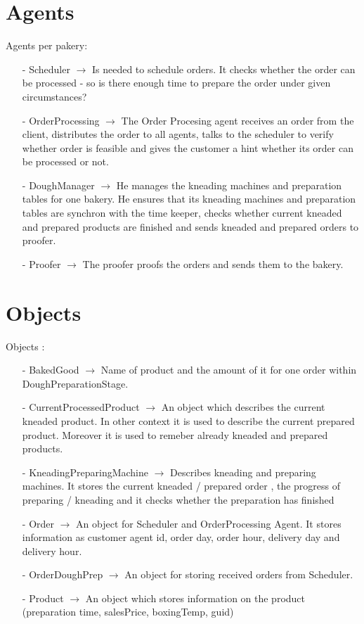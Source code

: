 \documentclass[10pt,a4paper]{article}
\begin{document}
	\section{Agents}
	Agents per pakery:
	\begin{enumerate}
		\item [-] Scheduler $\rightarrow$ Is needed to schedule orders. It checks whether the order can be processed - so is there enough time to prepare the order
		under given circumstances?
		\item [-] OrderProcessing $\rightarrow$ The Order Procesing agent receives an order from the client, distributes the order to all agents, talks to the scheduler
		to verify whether order is feasible and gives the customer a hint whether its order can be processed or not.
		\item [-] DoughManager $\rightarrow$ He manages the kneading machines and preparation tables for one bakery. He ensures that its kneading machines and preparation
		tables are synchron with the time keeper, checks whether current kneaded and prepared products are finished and sends kneaded and prepared orders to proofer.
		\item [-] Proofer $\rightarrow$ The proofer proofs the orders and sends them to the bakery.
	\end{enumerate}
	\section{Objects}
	Objects :
	\begin{enumerate}
		\item [-] BakedGood $\rightarrow$ Name of product and the amount of it for one order within DoughPreparationStage.
		\item [-] CurrentProcessedProduct $\rightarrow$ An object which describes the current kneaded product. In other
		context it is used to describe the current prepared product. Moreover it is used to remeber already kneaded
		and prepared products.
		\item [-] KneadingPreparingMachine $\rightarrow$ Describes kneading and preparing machines. It stores the current
		kneaded / prepared order , the progress of preparing / kneading and it checks whether the preparation has finished
		\item [-] Order $\rightarrow$ An object for Scheduler and OrderProcessing Agent. It stores information as customer
		agent id, order day, order hour, delivery day and delivery hour.
		\item [-] OrderDoughPrep $\rightarrow$ An object for storing received orders from Scheduler.
		\item [-] Product $\rightarrow$ An object which stores information on the product (preparation time,
		salesPrice, boxingTemp, guid)
	\end{enumerate}
\end{document}
